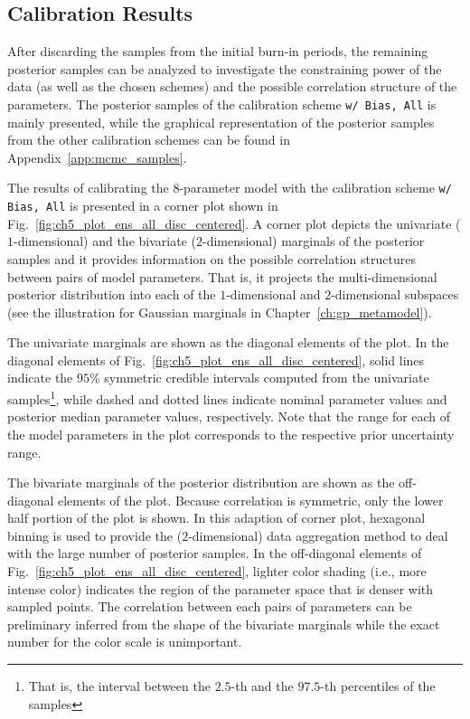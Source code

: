 \subsection{Calibration Results}\label{sub:bc_calibration_results}

After discarding the samples from the initial burn-in periods,
the remaining posterior samples can be analyzed to investigate the constraining power of the data (as well as the chosen schemes) and the possible correlation structure of the parameters.
The posterior samples of the calibration scheme \texttt{w/ Bias, All} is mainly presented, while the graphical representation of the posterior samples from the other calibration schemes can be found in Appendix~\ref{app:mcmc_samples}.

The results of calibrating the $8$-parameter model with the calibration scheme \texttt{w/ Bias, All} is presented in a corner plot shown in Fig.~\ref{fig:ch5_plot_ens_all_disc_centered}.
A corner plot \cite{Foreman-Mackey2016} depicts the univariate ($1$-dimensional) and the bivariate ($2$-dimen\-sional) marginals of the posterior samples and it provides information on the possible correlation structures between pairs of model parameters.
That is, it projects the multi-dimensional posterior distribution into each of the $1$-dimensional and $2$-dimensional subspaces (see the illustration for Gaussian marginals in Chapter~\ref{ch:gp_metamodel}).

The univariate marginals are shown as the diagonal elements of the plot.
In the diagonal elements of Fig.~\ref{fig:ch5_plot_ens_all_disc_centered}, solid lines indicate the $95\%$ symmetric credible intervals computed from the univariate samples\footnote{That is, the interval between the $2.5$-th and the $97.5$-th percentiles of the samples}, while dashed and dotted lines indicate nominal parameter values and posterior median parameter values, respectively.
Note that the range for each of the model parameters in the plot corresponds to the respective prior uncertainty range.

The bivariate marginals of the posterior distribution are shown as the off-diagonal elements of the plot.
Because correlation is symmetric, only the lower half portion of the plot is shown.
In this adaption of corner plot, hexagonal binning \cite{Carr2015} is used to provide the ($2$-dimensional) data aggregation method to deal with the large number of posterior samples.
In the off-diagonal elements of Fig.~\ref{fig:ch5_plot_ens_all_disc_centered}, lighter color shading (i.e., more intense color) indicates the region of the parameter space that is denser with sampled points.
The correlation between each pairs of parameters can be preliminary inferred from the shape of the bivariate marginals while the exact number for the color scale is unimportant.

